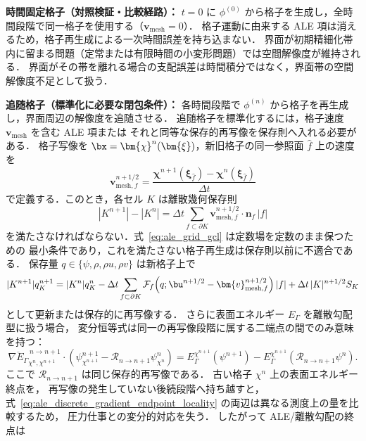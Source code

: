 \begin{tcolorbox}[mybox, title={固定格子経路と追随格子経路}]
\label{box:grid_modes}
\textbf{時間固定格子（対照検証・比較経路）：}
$t=0$ に $\phi^{(0)}$ から格子を生成し，全時間段階で同一格子を使用する（$\bm{v}_\text{mesh}=0$）．
格子運動に由来する ALE 項は消えるため，格子再生成による一次時間誤差を持ち込まない．
界面が初期精細化帯内に留まる問題（定常または有限時間の小変形問題）では空間解像度が維持される．
界面がその帯を離れる場合の支配誤差は時間積分ではなく，界面帯の空間解像度不足として扱う．

\textbf{追随格子（標準化に必要な閉包条件）：}
各時間段階で $\phi^{(n)}$ から格子を再生成し，界面周辺の解像度を追随させる．
追随格子を標準化するには，格子速度 $\bm{v}_\text{mesh}$ を含む ALE 項または
それと同等な保存的再写像を保存則へ入れる必要がある．
格子写像を $\bx=\bm{\chi}^{n}(\bm{\xi})$，新旧格子の同一参照面 $\hat f$ 上の速度を
\[
  \bm{v}_{\mathrm{mesh},f}^{n+1/2}
  =
  \frac{\bm{\chi}^{n+1}(\bm{\xi}_{\hat f})
        -\bm{\chi}^{n}(\bm{\xi}_{\hat f})}{\Delta t}
  \label{eq:mesh_velocity_regrid}
\]
で定義する．このとき，各セル $K$ は離散幾何保存則
\[
  |K^{n+1}|-|K^n|
  =
  \Delta t
  \sum_{f\subset\partial K}
    \bm{v}_{\mathrm{mesh},f}^{n+1/2}\cdot\bm{n}_f\, |f|
  \label{eq:ale_grid_gcl}
\]
を満たさなければならない．式~\eqref{eq:ale_grid_gcl} は定数場を定数のまま保つための
最小条件であり，これを満たさない格子再生成は保存則以前に不適合である．
保存量 $q\in\{\psi,\rho,\rho u,\rho v\}$ は新格子上で
\[
  |K^{n+1}|q_K^{n+1}
  =
  |K^n|q_K^n
  -\Delta t
  \sum_{f\subset\partial K}
    \mathcal{F}_f\!\left(q;\bu^{n+1/2}
      -\bm{v}_{\mathrm{mesh},f}^{n+1/2}\right)|f|
  +\Delta t\,|K|^{n+1/2}S_K
  \label{eq:ale_conservative_update}
\]
として更新または保存的に再写像する．
さらに表面エネルギー $E_\Gamma$ を離散勾配型に扱う場合，
変分恒等式は同一の再写像段階に属する二端点の間でのみ意味を持つ：
\begin{equation}
  \overline{\nabla E_\Gamma}^{\,n\to n+1}_{\chi^n,\chi^{n+1}}
  \cdot
  \left(\psi^{n+1}_{\chi^{n+1}}-\mathcal R_{n\to n+1}\psi^n_{\chi^n}\right)
  =
  E_\Gamma^{\chi^{n+1}}(\psi^{n+1})
  -
  E_\Gamma^{\chi^{n+1}}(\mathcal R_{n\to n+1}\psi^n).
  \label{eq:ale_discrete_gradient_endpoint_locality}
\end{equation}
ここで $\mathcal R_{n\to n+1}$ は同じ保存的再写像である．
古い格子 $\chi^n$ 上の表面エネルギー終点を，
再写像の発生していない後続段階へ持ち越すと，
式~\eqref{eq:ale_discrete_gradient_endpoint_locality} の両辺は異なる測度上の量を比較するため，
圧力仕事との変分的対応を失う．
したがって ALE/離散勾配の終点は

\end{tcolorbox}
